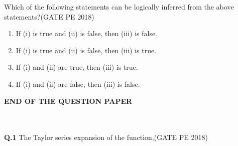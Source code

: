 \documentclass[15pt,a4paper]{article}
\renewcommand{\headrulewidth}{1.4pt}
\begin{document}
\noindent
Which of the following statements can be logically inferred from the above statements?\hfill(GATE PE 2018)

\begin{enumerate}
\item If (i) is true and (ii) is false, then (iii) is false.
\item If (i) is true and (ii) is false, then (iii) is true.
\item If (i) and (ii) are true, then (iii) is true.
\item If (i) and (ii) are false, then (iii) is false.
\end{enumerate}

\vspace{5cm}

\begin{center}
	{\LARGE \textbf{END OF THE QUESTION PAPER}}
\end{center}

\clearpage
{}
\fancyfoot[R]{\thepage}

\renewcommand{\headrulewidth}{0.4pt}

\fancyfoot[R]{\thepage/\pageref{LastPage}}


\\\\
\noindent
\textbf{Q.1} The Taylor series expansion of the function,\hfill(GATE PE 2018)\\\\
\end{document}
